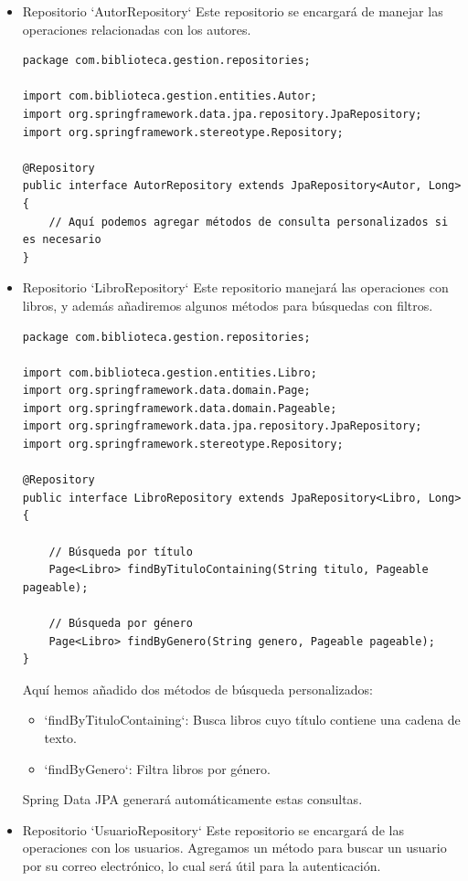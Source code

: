 \documentclass[11pt]{article}
\begin{document}
\begin{itemize}
\item Repositorio `AutorRepository`
\label{sec:org9bd2f96}
Este repositorio se encargará de manejar las operaciones relacionadas con los autores.

\begin{verbatim}
package com.biblioteca.gestion.repositories;

import com.biblioteca.gestion.entities.Autor;
import org.springframework.data.jpa.repository.JpaRepository;
import org.springframework.stereotype.Repository;

@Repository
public interface AutorRepository extends JpaRepository<Autor, Long> {
    // Aquí podemos agregar métodos de consulta personalizados si es necesario
}
\end{verbatim}

\item Repositorio `LibroRepository`
\label{sec:org8d48629}
Este repositorio manejará las operaciones con libros, y además añadiremos algunos métodos para búsquedas con filtros.

\begin{verbatim}
package com.biblioteca.gestion.repositories;

import com.biblioteca.gestion.entities.Libro;
import org.springframework.data.domain.Page;
import org.springframework.data.domain.Pageable;
import org.springframework.data.jpa.repository.JpaRepository;
import org.springframework.stereotype.Repository;

@Repository
public interface LibroRepository extends JpaRepository<Libro, Long> {

    // Búsqueda por título
    Page<Libro> findByTituloContaining(String titulo, Pageable pageable);

    // Búsqueda por género
    Page<Libro> findByGenero(String genero, Pageable pageable);
}
\end{verbatim}

Aquí hemos añadido dos métodos de búsqueda personalizados:
\begin{itemize}
\item `findByTituloContaining`: Busca libros cuyo título contiene una cadena de texto.
\item `findByGenero`: Filtra libros por género.
\end{itemize}

Spring Data JPA generará automáticamente estas consultas.

\item Repositorio `UsuarioRepository`
\label{sec:orgc26a59e}
Este repositorio se encargará de las operaciones con los usuarios. Agregamos un método para buscar un usuario por su correo electrónico, lo cual será útil para la autenticación.


\end{itemize}
\end{document}

